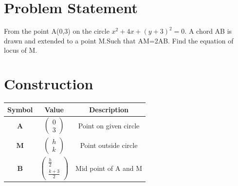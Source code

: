 \documentclass[10pt,a4paper]{report}
\newcommand{\myvec}[1]{\ensuremath{\begin{pmatrix}#1\end{pmatrix}}}
\let\vec\mathbf
\begin{document}
\begin{multicols}{2}
\section*{Problem Statement}
From the point A(0,3) on the circle $x^2+4x+(y+3)^2=0$. A chord AB is drawn and extended to a point M.Such that AM=2AB. Find the equation of locus of M.
\section*{Construction}
\hspace{0.25cm}
\begin{tabular}{|c|c|c|}
	\hline
	\textbf{Symbol}&\textbf{Value}&\textbf{Description}\\
	\hline
    $\vec{A}$&$\myvec{0 \\ 3}$&Point on given circle\\
	\hline
	$\vec{M}$&$\myvec{h \\ k}$ & Point outside circle\\
	 \hline
	 $\vec{B}$ & $\myvec{\frac{h}{2} \\ \frac{k+3}{2}}$& Mid point of A and M\\


\end{tabular}
\end{multicols}
\end{document}
